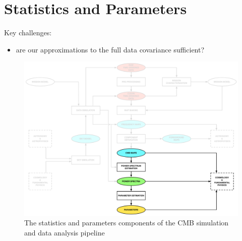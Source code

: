 
\section{Statistics and Parameters}

Key challenges:
\begin{itemize}
\item are our approximations to the full data covariance sufficient?
\end{itemize}

\begin{figure}[htbp]
\centering
\includegraphics[width=1\textwidth]{Analysis/sp}
\caption{The statistics and parameters components of the CMB simulation and data analysis pipeline}
\label{default}

\end{figure}


%



